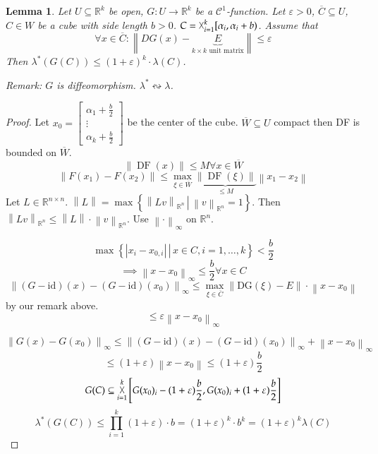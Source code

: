 \documentclass{article}
\newtheorem{lemma}{Lemma}  \numberwithin{lemma}{section}
\newcommand{\setdef}[2]{\left\{\left.#1\,\right|\,#2\right\}}
\newcommand{\norm}[1]{\left\|#1\right\|}
\newcommand{\card}[1]{\left|#1\right|}
\DeclareMathOperator*{\bigtimes}{\vartimes}
\begin{document}
\begin{lemma}
  Let $U \subseteq \mathbb R^k$ be open, $G: U \to \mathbb R^k$ be a $\mathcal C^1$-function.
  Let $\varepsilon > 0$, $\overline{C} \subseteq U$, $C \in W$ be a cube with side length $b > 0$.
  $C = \bigtimes_{i=1}^k [\alpha_i, \alpha_i+b)$. Assume that
  \[ \forall x \in \overline {C}: \norm{DG(x) - \underbrace{E}_{k\times k \text{ unit matrix}}} \leq \varepsilon \]
  Then $\lambda^*(G(C)) \leq (1 + \varepsilon)^k \cdot \lambda(C)$.

  Remark: $G$ is diffeomorphism. $\lambda^* \leftrightsquigarrow \lambda$.
\end{lemma}
\begin{proof}
  Let $x_0 = \begin{bmatrix} \alpha_1 + \frac b2 \\ \vdots \\ \alpha_k + \frac b2 \end{bmatrix}$
  be the center of the cube.
  $\overline{W} \subseteq U$ compact then DF is bounded on $\overline{W}$.
  \[ \norm{\operatorname{DF}(x)} \leq M \forall x \in \overline{W} \]
  \[ \norm{F(x_1) - F(x_2)} \leq \max_{\xi \in \overline{W}} \underbrace{\norm{\operatorname{DF}(\xi)}}_{\leq M} \norm{x_1 - x_2} \]
  Let $L \in \mathbb R^{n\times n}$. $\norm{L} = \max\setdef{\norm{Lv}_{{\mathbb R^n}}}{\norm{v}_{\mathbb R^n} = 1}$.
  Then $\norm{Lv}_{\mathbb R^n} \leq \norm{L} \cdot \norm{v}_{\mathbb R^n}$. Use $\norm{\cdot}_\infty$ on $\mathbb R^n$.

  \[ \max\setdef{\card{x_i - x_{0,i}}}{x \in C, i = 1,\ldots,k} < \frac b2 \]
  \[ \implies \norm{x - x_0}_{\infty} \leq \frac b2 \forall x \in C \]
  \[ \norm{(G - \text{id})(x) - (G - \text{id})(x_0)}_{\infty} \leq \max_{\xi \in \overline{C}} \norm{\text{DG}(\xi) - E} \cdot \norm{x - x_0} \]
  by our remark above.
  \[ \leq \varepsilon \norm{x - x_0}_\infty \]

  \[ \norm{G(x) - G(x_0)}_{\infty} \leq \norm{(G - \text{id})(x) - (G - \text{id})(x_0)}_{\infty} + \norm{x - x_0}_{\infty} \]
  \[ \leq (1 + \varepsilon)\norm{x - x_0} \leq (1 + \varepsilon) \frac{b}{2} \]
  \[ G(C) \subseteq \bigtimes_{i=1}^{k} \left[ G(x_0)_i - (1 + \varepsilon) \frac b2, G(x_0)_i + (1 + \varepsilon) \frac b2 \right] \]
  \[ \lambda^*(G(C)) \leq \prod_{i=1}^k (1 + \varepsilon) \cdot b = (1 + \varepsilon)^k \cdot b^k = (1 + \varepsilon)^k \lambda(C) \]
\end{proof}
\end{document}
